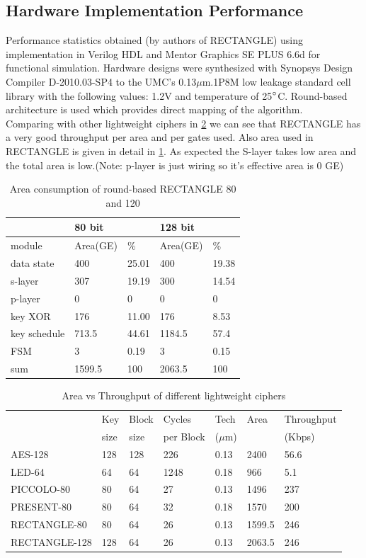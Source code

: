 \documentclass[final]{transcrypto}
\begin{document}
\subsection{Hardware Implementation Performance}
Performance statistics obtained (by authors of RECTANGLE) using implementation in Verilog HDL and Mentor Graphics SE PLUS 6.6d for functional simulation. Hardware designs were synthesized with Synopsys Design Compiler D-2010.03-SP4 to the UMC's 0.13$\mu$m.1P8M low leakage standard cell library with the following values: 1.2V and temperature of 25$\degree$C. Round-based architecture is used which provides direct mapping of the algorithm.\cite{rectangle}\\
Comparing with other lightweight ciphers in \ref{table:compar} we can see that RECTANGLE has a very good throughput per area and per gates used. Also area used in RECTANGLE is given in detail in \ref{table:area}. As expected the S-layer takes low area and the total area is low.(Note: p-layer is just wiring so it's effective area is 0 GE)
\begin{table}[H]
	\centering
	\caption{Area consumption of round-based RECTANGLE 80 and 120}
	\begin{tabular}{|l||l|l|l|l|}
		\hline
&80 bit&&128 bit&\\
\hline
module& Area(GE) & \% & Area(GE) & \% \\ \hline
\hline
data state & 400 & 25.01 & 400 & 19.38\\ \hline
s-layer & 307 & 19.19 & 300 & 14.54\\ \hline
p-layer & 0 & 0 & 0 & 0\\ \hline
key XOR & 176 & 11.00 & 176 & 8.53\\ \hline
key schedule & 713.5 & 44.61 & 1184.5 & 57.4\\ \hline
FSM & 3 & 0.19 & 3 & 0.15\\ \hline
sum & 1599.5 & 100 & 2063.5 & 100\\ \hline
	\end{tabular}
	\label{table:area}
\end{table}

\begin{table}[H]
	\centering
	\caption{Area vs Throughput of different lightweight ciphers}
	\begin{tabular}{|l||l|l|l|l|l|l|}
		\hline
&Key & Block& Cycles& Tech & Area & Throughput\\
&size &size & per Block &($\mu$m) &  & (Kbps)\\ \hline \hline
AES-128 & 128 & 128 & 226 & 0.13 & 2400 & 56.6\\\hline
LED-64 & 64 & 64 & 1248 & 0.18 & 966 & 5.1\\\hline
PICCOLO-80 & 80 & 64 & 27 & 0.13 & 1496 & 237 \\\hline
PRESENT-80 &  80 &  64 & 32 & 0.18 & 1570 & 200 \\\hline
RECTANGLE-80 & 80 &  64 & 26 & 0.13 & 1599.5 & 246 \\\hline
RECTANGLE-128 & 128 & 64 & 26 & 0.13 & 2063.5 & 246 \\
\hline
	\end{tabular}
	\label{table:compar}
\end{table}
\end{document}
